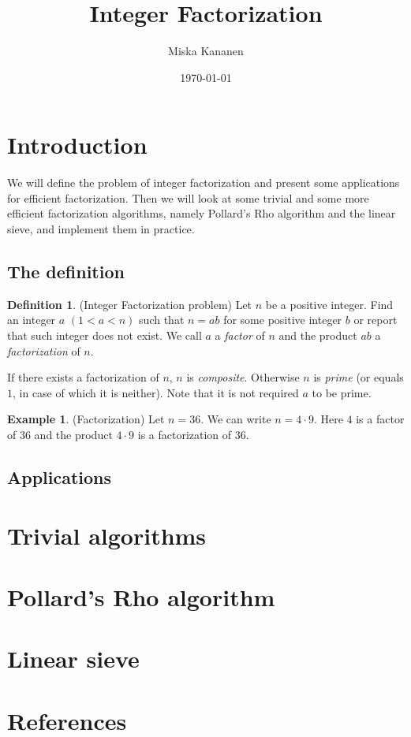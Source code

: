 \documentclass[12pt] {article}
\theoremstyle{plain}
\theoremstyle{definition}
\newtheorem{defn}[thm]{Definition}
\newtheorem{exmp}[thm]{Example}
\begin{document}
\title {Integer Factorization}
\author {Miska Kananen}
\date {\today}
\maketitle

\tableofcontents

\section {Introduction}

We will define the problem of integer factorization and present some applications for efficient factorization. Then we will look at some trivial and some more efficient factorization algorithms, namely Pollard's Rho algorithm and the linear sieve, and implement them in practice.

\subsection {The definition}

\begin{defn} (Integer Factorization problem)
Let $n$ be a positive integer. Find an integer $a$ $(1 < a < n)$ such that $n = ab$ for some positive integer $b$ or report that such integer does not exist. We call $a$ a \textit{factor} of $n$ and the product $ab$ a \textit{factorization} of $n$.
\end{defn}

If there exists a factorization of $n$, $n$ is \textit{composite}. Otherwise $n$ is \textit{prime} (or equals $1$, in case of which it is neither). Note that it is not required $a$ to be prime. 

\begin{exmp} (Factorization)
Let $n = 36$. We can write $n = 4 \cdot 9$. Here $4$ is a factor of $36$ and the product $4 \cdot 9$ is a factorization of $36$.
\end{exmp}

\subsection {Applications}

\section {Trivial algorithms}

\section {Pollard's Rho algorithm}

\section {Linear sieve}

\section {References}
\end{document}
